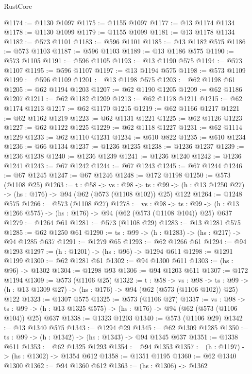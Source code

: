 \begin{lexlean}{RustCore}
\begin{coremodule}
@1174 := @1130 @1097
@1175 := @1155 @1097
@1177 := @13 @1174 @1134
@1178 := @1130 @1099
@1179 := @1155 @1099
@1181 := @13 @1178 @1134
@1182 := @573 @1101
@1183 := @596 @1101
@1185 := @13 @1182 @575
@1186 := @573 @1103
@1187 := @596 @1103
@1189 := @13 @1186 @575
@1190 := @573 @1105
@1191 := @596 @1105
@1193 := @13 @1190 @575
@1194 := @573 @1107
@1195 := @596 @1107
@1197 := @13 @1194 @575
@1198 := @573 @1109
@1199 := @596 @1109
@1201 := @13 @1198 @575
@1203 := @62 @1198 @61
@1205 := @62 @1194 @1203
@1207 := @62 @1190 @1205
@1209 := @62 @1186 @1207
@1211 := @62 @1182 @1209
@1213 := @62 @1178 @1211
@1215 := @62 @1174 @1213
@1217 := @62 @1170 @1215
@1219 := @62 @1166 @1217
@1221 := @62 @1162 @1219
@1223 := @62 @1131 @1221
@1225 := @62 @1126 @1223
@1227 := @62 @1122 @1225
@1229 := @62 @1118 @1227
@1231 := @62 @1114 @1229
@1233 := @62 @1110 @1231
@1234 := @610 @822
@1235 := @610 @1234
@1236 := @66 @1134
@1237 := @1236 @1235
@1238 := @1236 @1237
@1239 := @1236 @1238
@1240 := @1236 @1239
@1241 := @1236 @1240
@1242 := @1236 @1241
@1243 := @67 @1242
@1244 := @67 @1243
@1245 := @67 @1244
@1246 := @67 @1245
@1247 := @67 @1246
@1248 := @172 @1198
@1250 := @573 (@1108 @25)
@1263 := {t : @58} ->
  {vs : @98} ->
  {ts : @99} -> (h : @13 @1250 @27) -> (hs : @176) -> @94 (@62 (@573 (@1108 @102)) @25) @122
@1264 := @1248 @575
@1266 := @573 (@1108 @27)
@1278 := {vs : @98} ->
  {ts : @99} -> (h : @13 @1266 @575) -> (hs : @176) -> @94 (@62 (@573 (@1108 @104)) @25) @637
@1279 := @1264 @61
@1281 := @573 (@1108 @29)
@1283 := @13 @1281 @575
@1285 := @62 @1250 @61
@1290 := {ts : @99} -> (h : @1283) -> (hs : @217) -> @94 @1285 @637
@1291 := @1279 @65
@1293 := @62 @1266 @61
@1294 := @94 @1293
@1297 := (h : @1201) -> (hs : @96) -> @1294 @611
@1298 := @1291 @1199
@1300 := @62 @1281 @61
@1302 := @94 @1300 @611
@1303 := (hs : @96) -> @1302
@1304 := @1298 @93
@1306 := @94 @1203 @611
@1307 := @172 @1194
@1309 := @573 (@1106 @25)
@1322 := {t : @58} ->
  {vs : @98} ->
  {ts : @99} -> (h : @13 @1309 @27) -> (hs : @176) -> @94 (@62 (@573 (@1106 @102)) @25) @122
@1323 := @1307 @575
@1325 := @573 (@1106 @27)
@1337 := {vs : @98} ->
  {ts : @99} -> (h : @13 @1325 @575) -> (hs : @176) -> @94 (@62 (@573 (@1106 @104)) @25) @637
@1338 := @1323 @1203
@1340 := @573 (@1106 @29)
@1342 := @13 @1340 @575
@1343 := @1294 @29
@1345 := @62 @1309 @1285
@1350 := {ts : @99} -> (h : @1342) -> (hs : @1343) -> @94 @1345 @637
@1351 := @1338 @611
@1353 := @62 @1325 @1293
@1354 := @94 @1353
@1357 := (h : @1197) -> (hs : @1302) -> @1354 @612
@1358 := @1351 @1195
@1360 := @62 @1340 @1300
@1362 := @94 @1360 @612
@1363 := (hs : @1306) -> @1362

\end{coremodule}
\end{lexlean}
